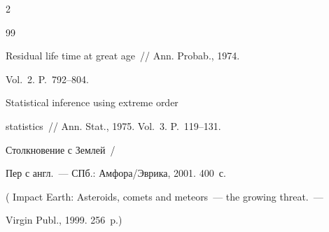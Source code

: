 \begin{multicols}{2}
{{\begin{thebibliography}{99}


























 Residual life time at great age~// Ann. Probab., 1974. 


Vol.~2. P.~792--804.







 Statistical inference using extreme order


statistics~// Ann. Stat., 1975. Vol.~3. P.~119--131.







 Столкновение с Землей~/


Пер с англ.~--- СПб.: Ам\-фо\-ра/Эв\-ри\-ка, 2001. 400~с.


( Impact Earth: Asteroids, comets and meteors~--- the growing threat.~---


Virgin Publ., 1999. 256~p.)


\end{thebibliography} } }











\end{multicols}






